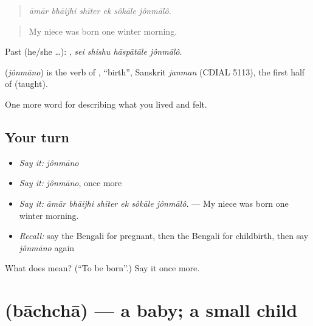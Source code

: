 \begin{quote}
     
\end{quote}

\begin{quote}
\emph{āmār bhāijhi shīter ek sôkāle jônmālô.}
\end{quote}

\begin{quote}
My niece was born one winter morning.
\end{quote}

Past (he/she …):    , \emph{sei shishu hāspātāle jônmālô}.

\begin{cousinweb}
\textbf{} (\emph{jônmāno}) is the verb of , \textquotedblleft{}birth\textquotedblright{}, Sanskrit \emph{janman} (CDIAL 5113), the first half of  (taught).
\end{cousinweb}

\begin{grammarlens}[title={What you've built}]
One more word for describing what you lived and felt.
\end{grammarlens}

\subsection*{Your turn}
\begin{itemize}
\raggedright
  \item \emph{Say it:} \emph{jônmāno}
  \item \emph{Say it:} \emph{jônmāno}, once more
  \item \emph{Say it:} \emph{āmār bhāijhi shīter ek sôkāle jônmālô.} — My niece was born one winter morning.
  \item \emph{Recall:} say the Bengali for pregnant, then the Bengali for childbirth, then say \emph{jônmāno} again
\end{itemize}

\begin{tcolorbox}[breakable,colback=teal!4,colframe=teal!35!black,title={Before you move on}]
What does  mean? (\textquotedblleft{}To be born\textquotedblright{}.) Say it once more.
\end{tcolorbox}
\section[\texorpdfstring{\bn{বাচ্চা} (bāchchā)}{বাচ্চা (bāchchā)}]{ (bāchchā) — a baby; a small child}

